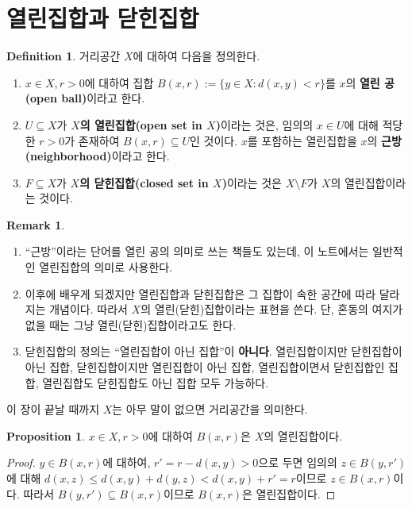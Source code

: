 \documentclass[11pt]{book}
\numberwithin{equation}{chapter}
\theoremstyle{definition}
\newtheorem{prop}[thm]{Proposition}
\newtheorem{defn}[thm]{Definition}
\newtheorem*{rem}{Remark}
\begin{document}
\section{열린집합과 닫힌집합}

\begin{defn}
    거리공간 \(X\)에 대하여 다음을 정의한다.
    \begin{enumerate} [label=(\alph*), leftmargin=2\parindent]
        \item \(x \in X, r > 0\)에 대하여 집합 \(B(x, r) := \{y \in X : d(x, y) < r\}\)를 \(x\)의 \textbf{열린 공(open ball)}이라고 한다.
        \item \(U \subseteq X\)가 \textbf{\(X\)의 열린집합(open set in \(X\))}이라는 것은, 임의의 \(x \in U\)에 대해 적당한 \(r > 0\)가 존재하여 \(B(x, r) \subseteq U\)인 것이다. \(x\)를 포함하는 열린집합을 \(x\)의 \textbf{근방(neighborhood)}이라고 한다.
        \item \(F \subseteq X\)가 \textbf{\(X\)의 닫힌집합(closed set in \(X\))}이라는 것은 \(X \setminus F\)가 \(X\)의 열린집합이라는 것이다.
    \end{enumerate}
\end{defn}
\begin{rem}
    \quad

    \begin{enumerate}[label=(\alph*), leftmargin=2\parindent]
        \item ``근방''이라는 단어를 열린 공의 의미로 쓰는 책들도 있는데, 이 노트에서는 일반적인 열린집합의 의미로 사용한다.
        \item 이후에 배우게 되겠지만 열린집합과 닫힌집합은 그 집합이 속한 공간에 따라 달라지는 개념이다. 따라서 \(X\)의 열린(닫힌)집합이라는 표현을 쓴다. 단, 혼동의 여지가 없을 때는 그냥 열린(닫힌)집합이라고도 한다.
        \item 닫힌집합의 정의는 ``열린집합이 아닌 집합''이 \textbf{아니다}. 열린집합이지만 닫힌집합이 아닌 집합, 닫힌집합이지만 열린집합이 아닌 집합, 열린집합이면서 닫힌집합인 집합, 열린집합도 닫힌집합도 아닌 집합 모두 가능하다.
    \end{enumerate}
\end{rem}

이 장이 끝날 때까지 \(X\)는 아무 말이 없으면 거리공간을 의미한다.

\begin{prop}
    \(x \in X, r >0\)에 대하여 \(B(x, r)\)은 \(X\)의 열린집합이다.
\end{prop}
\begin{proof}
    \(y \in B(x, r)\)에 대하여, \(r' = r - d(x, y) > 0\)으로 두면 임의의 \(z \in B(y, r')\)에 대해 \(d(x, z) \le d(x, y) + d(y, z) < d(x, y) + r' = r\)이므로 \(z \in B(x, r)\)이다. 따라서 \(B(y, r') \subseteq B(x, r)\)이므로 \(B(x, r)\)은 열린집합이다.
\end{proof}
\end{document}
